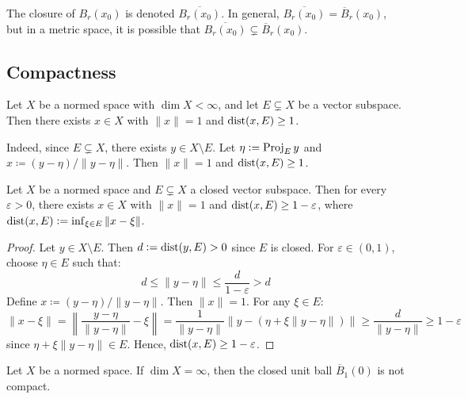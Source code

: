 The closure of \( B_r(x_0) \) is denoted \( \overline{B_r(x_0)} \). In general, \( \overline{B_r(x_0)} = \overline{B}_r(x_0) \), but in a metric space, it is possible that \( \overline{B_r(x_0)} \subsetneq \overline{B}_r(x_0) \).

\subsection{Compactness}

\begin{example}
Let \( X \) be a normed space with \( \dim X < \infty \), and let \( E \subsetneq X \) be a vector subspace. Then there exists \( x \in X \) with \( \|x\| = 1 \) and \( \operatorname{dist}(x, E) \geq 1 \).

Indeed, since \( E \subsetneq X \), there exists \( y \in X \setminus E \). Let \( \eta \mathrel{\mathop:}= \operatorname{Proj}_E y \) and \( x \coloneqq (y - \eta)/\|y - \eta\| \). Then \( \|x\| = 1 \) and \( \operatorname{dist}(x, E) \geq 1 \).
\end{example}

\begin{lemma}[Riesz]
Let \( X \) be a normed space and \( E \subsetneq X \) a closed vector subspace. Then for every \( \varepsilon > 0 \), there exists \( x \in X \) with \( \|x\| = 1 \) and \( \operatorname{dist}(x, E) \geq 1 - \varepsilon \), where \( \operatorname{dist}(x, E) \mathrel{\mathop:}= \inf_{\xi \in E} \|x - \xi\| \).
\end{lemma}

\begin{proof}
Let \( y \in X \setminus E \). Then \( d \mathrel{\mathop:}= \operatorname{dist}(y, E) > 0 \) since \( E \) is closed. For \( \varepsilon \in (0,1) \), choose \( \eta \in E \) such that:
\[
d \leq \|y - \eta\| \leq \frac{d}{1 - \varepsilon} > d
\]
Define \( x \coloneqq (y - \eta)/\|y - \eta\| \). Then \( \|x\| = 1 \). For any \( \xi \in E \):
\[
\|x - \xi\| = \left\| \frac{y - \eta}{\|y - \eta\|} - \xi \right\| = \frac{1}{\|y - \eta\|} \|y - (\eta + \xi \|y - \eta\|) \| \geq \frac{d}{\|y - \eta\|} \geq 1 - \varepsilon
\]
since \( \eta + \xi \|y - \eta\| \in E \). Hence, \( \operatorname{dist}(x, E) \geq 1 - \varepsilon \).
\end{proof}

\clearpage
\begin{theorem}[Riesz]
Let \( X \) be a normed space. If \( \dim X = \infty \), then the closed unit ball \( \overline{B}_1(0) \) is not compact.
\end{theorem}

